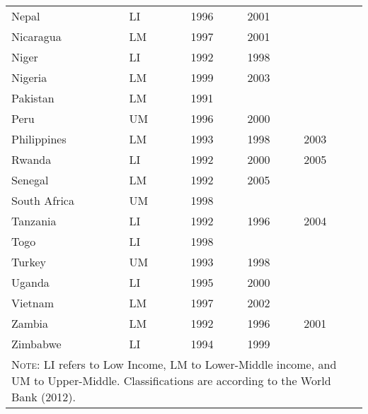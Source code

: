 \begin{table}[ht!]
\begin{center}
\begin{tabular}{l l c c c c}
Nepal	&	LI		&	1996	&	2001	&		&		\\
Nicaragua	&	LM	&	1997	&	2001	&		&		\\
Niger	&	LI		&	1992	&	1998	&		&		\\
Nigeria	&	LM		&	1999	&	2003	&		&		\\
Pakistan	&	LM	&	1991	&		&		&		\\
Peru	&	UM		&	1996	&	2000	&		&		\\
Philippines	&	LM	&	1993	&	1998	&	2003	&		\\
Rwanda	&	LI		&	1992	&	2000	&	2005	&		\\
Senegal	&	LM		&	1992	&	2005	&		&		\\
South Africa	&	UM	&	1998	&		&		&		\\
Tanzania	&	LI	&	1992	&	1996	&	2004	&		\\
Togo	&	LI		&	1998	&		&		&		\\
Turkey	&	UM		&	1993	&	1998	&		&		\\
Uganda	&	LI		&	1995	&	2000	&		&		\\
Vietnam	&	LM		&	1997	&	2002	&		&		\\
Zambia	&	LM		&	1992	&	1996	&	2001	&		\\
Zimbabwe	& LI	&	1994	&	1999	&		&		\\
\midrule
\multicolumn{6}{p{10.5cm}}{\footnotesize\textsc{Note:} LI refers to Low Income, LM to Lower-Middle income, and UM to Upper-Middle.
Classifications are according to the World Bank (2012).}\\

\bottomrule
\end{tabular}
\end{center}
\end{table}